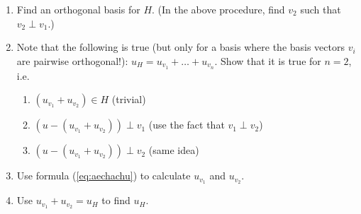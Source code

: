 \documentclass[11pt]{article}
\begin{document}
  \begin{enumerate}
  \item Find an orthogonal basis for $H$. (In the above procedure,
    find $v_{2}$ such that $v_{2}\perp{}v_{1}$.)
  \item Note that the following is true (but only for a basis where
    the basis vectors $v_{i}$ are pairwise orthogonal!):
    $u_{H}=u_{v_{1}}+{\ldots}+u_{v_{n}}$. Show that it is true for
    $n=2$, i.e.\
      \begin{enumerate}
  \item $(u_{v_{1}}+u_{v_{2}})\in{}H$ (trivial)
  \item $(u-(u_{v_{1}}+u_{v_{2}}))\perp{}v_{1}$ (use the fact that $v_{1}\perp{}v_{2}$)
  \item $(u-(u_{v_{1}}+u_{v_{2}}))\perp{}v_{2}$ (same idea)
  \end{enumerate}
  \item Use formula (\ref{eq:aechachu}) to calculate $u_{v_{1}}$ and
    $u_{v_{2}}$. 
  \item Use $u_{v_{1}}+u_{v_{2}}=u_{H}$ to find $u_{H}$.
  \end{enumerate}
\end{document}
